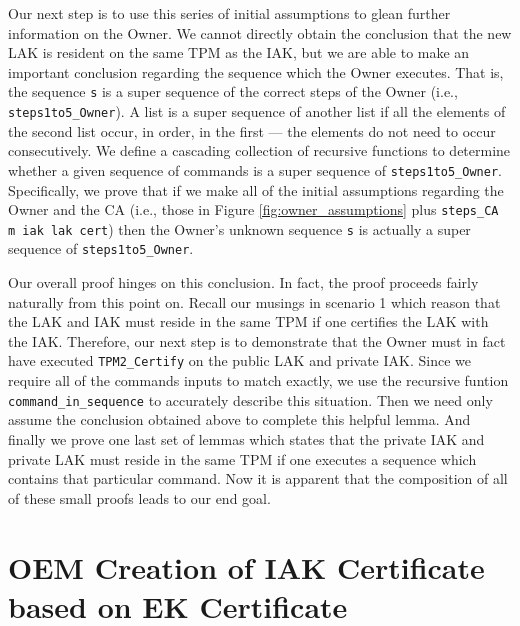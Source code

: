 Our next step is to use this series of initial assumptions to glean further information on the Owner. We cannot directly obtain the conclusion that the new LAK is resident on the same TPM as the IAK, but we are able to make an important conclusion regarding the sequence which the Owner executes. That is, the sequence \verb|s| is a super sequence of the correct steps of the Owner (i.e., \verb|steps1to5_Owner|). A list is a super sequence of another list if all the elements of the second list occur, in order, in the first --- the elements do not need to occur consecutively. We define a cascading collection of recursive functions to determine whether a given sequence of commands is a super sequence of \verb|steps1to5_Owner|. Specifically, we prove that if we make all of the initial assumptions regarding the Owner and the CA (i.e., those in Figure \ref{fig:owner_assumptions} plus \verb|steps_CA m iak lak cert|) then the Owner's unknown sequence \verb|s| is actually a super sequence of \verb|steps1to5_Owner|. 

Our overall proof hinges on this conclusion. In fact, the proof proceeds fairly naturally from this point on. Recall our musings in scenario 1 which reason that the LAK and IAK must reside in the same TPM if one certifies the LAK with the IAK. Therefore, our next step is to demonstrate that the Owner must in fact have executed \verb|TPM2_Certify| on the public LAK and private IAK. Since we require all of the commands inputs to match exactly, we use the recursive funtion \verb|command_in_sequence| to accurately describe this situation. Then we need only assume the conclusion obtained above to complete this helpful lemma. And finally we prove one last set of lemmas which states that the private IAK and private LAK must reside in the same TPM if one executes a sequence which contains that particular command.
Now it is apparent that the composition of all of these small proofs leads to our end goal.




\newpage
\section{OEM Creation of IAK Certificate based on EK Certificate}

